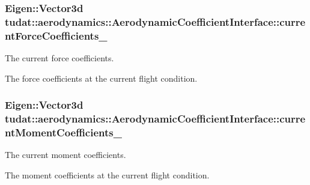 \subsubsection[{\texorpdfstring{current\+Force\+Coefficients\+\_\+}{currentForceCoefficients_}}]{\setlength{\rightskip}{0pt plus 5cm}Eigen\+::\+Vector3d tudat\+::aerodynamics\+::\+Aerodynamic\+Coefficient\+Interface\+::current\+Force\+Coefficients\+\_\+\hspace{0.3cm}{\ttfamily [protected]}}\hypertarget{classtudat_1_1aerodynamics_1_1AerodynamicCoefficientInterface_ac2e2b9a55f0269a611599a652a556c9a}{}\label{classtudat_1_1aerodynamics_1_1AerodynamicCoefficientInterface_ac2e2b9a55f0269a611599a652a556c9a}


The current force coefficients. 

The force coefficients at the current flight condition. 
\subsubsection[{\texorpdfstring{current\+Moment\+Coefficients\+\_\+}{currentMomentCoefficients_}}]{\setlength{\rightskip}{0pt plus 5cm}Eigen\+::\+Vector3d tudat\+::aerodynamics\+::\+Aerodynamic\+Coefficient\+Interface\+::current\+Moment\+Coefficients\+\_\+\hspace{0.3cm}{\ttfamily [protected]}}\hypertarget{classtudat_1_1aerodynamics_1_1AerodynamicCoefficientInterface_a421867bb3bd06711019c80621ac75473}{}\label{classtudat_1_1aerodynamics_1_1AerodynamicCoefficientInterface_a421867bb3bd06711019c80621ac75473}


The current moment coefficients. 

The moment coefficients at the current flight condition. 
